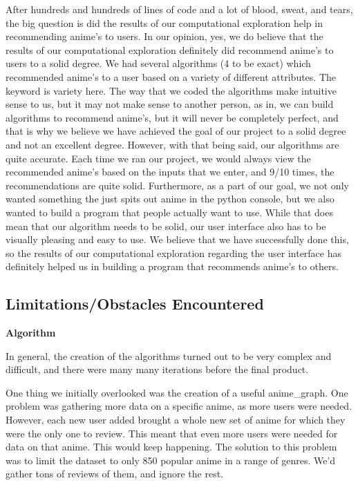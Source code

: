 \documentclass[fontsize=11pt]{article}
\begin{document}
After hundreds and hundreds of lines of code and a lot of blood, sweat, and tears, the big question is did the results of our computational exploration help in recommending anime's to users. In our opinion, yes, we do believe that the results of our computational exploration definitely did recommend anime's to users to a solid degree. We had several algorithms (4 to be exact) which recommended anime's to a user based on a variety of different attributes. The keyword is variety here. The way that we coded the algorithms make intuitive sense to us, but it may not make sense to another person, as in, we can build algorithms to recommend anime's, but it will never be completely perfect, and that is why we believe we have achieved the goal of our project to a solid degree and not an excellent degree. However, with that being said, our algorithms are quite accurate. Each time we ran our project, we would always view the recommended anime's based on the inputs that we enter, and 9/10 times, the recommendations are quite solid. Furthermore, as a part of our goal, we not only wanted something the just spits out anime in the python console, but we also wanted to build a program that people actually want to use. While that does mean that our algorithm needs to be solid, our user interface also has to be visually pleasing and easy to use. We believe that we have successfully done this, so the results of our computational exploration regarding the user interface has definitely helped us in building a program that recommends anime's to others. 
\subsection{Limitations/Obstacles Encountered}
\textbf{Algorithm}

\item[]In general, the creation of the algorithms turned out to be very complex and difficult, and there were many many iterations before the final product.

\item[]One thing we initially overlooked was the creation of a useful anime\_graph. One problem was gathering more data on a specific anime, as more users were needed. However, each new user added brought a whole new set of anime for which they were the only one to review. This meant that even more users were needed for data on that anime. This would keep happening. The solution to this problem was to limit the dataset to only 850 popular anime in a range of genres. We’d gather tons of reviews of them, and ignore the rest.
\end{document}
